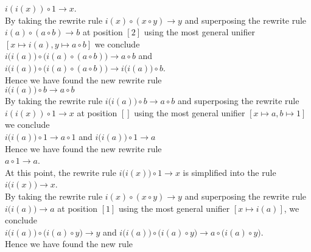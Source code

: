 $i(i(x)) \circ 1 \rightarrow x$.
\\[0.2cm]
By taking the rewrite rule $i(x) \circ (x \circ y) \rightarrow y$ and superposing the rewrite rule $i(a) \circ (a \circ b) \rightarrow b$
at position $[2]$ using the most general unifier $[x \mapsto i(a), y \mapsto a \circ b]$ we conclude
\\[0.2cm]
\hspace*{1.3cm}
$i\bigl(i(a)\bigr) \circ \bigl(i(a) \circ (a \circ b)\bigr) \rightarrow a \circ b $ \quad and \quad
$i\bigl(i(a)\bigr) \circ \bigl(i(a) \circ (a \circ b)\bigr) \rightarrow i\bigl(i(a)\bigr) \circ b$.
\\[0.2cm]
Hence we have found the new rewrite rule
\\[0.2cm]
\hspace*{1.3cm}
$i\bigl(i(a)\bigr) \circ b \rightarrow a \circ b$
\\[0.2cm]
By taking the rewrite rule $i\bigl(i(a)\bigr) \circ b \rightarrow a \circ b$ and superposing the rewrite rule $i(i(x)) \circ 1 \rightarrow x$ at position $[]$
using the most general unifier $[x \mapsto a, b \mapsto 1]$ we conclude  
\\[0.2cm]
\hspace*{1.3cm}
$i\bigl(i(a)\bigr) \circ 1 \rightarrow a \circ 1$ \quad and \quad
$i\bigl(i(a)\bigr) \circ 1 \rightarrow a$
\\[0.2cm]
Hence we have found the new rewrite rule
\\[0.2cm]
\hspace*{1.3cm}
$a \circ 1 \rightarrow a$.
\\[0.2cm]
At this point, the rewrite rule $i\bigl(i(x)\bigr) \circ 1 \rightarrow x$ is simplified into the rule
\\[0.2cm]
\hspace*{1.3cm}
$i\bigl(i(x)\bigr) \rightarrow x$.
\\[0.2cm]
By taking the rewrite rule $i(x) \circ (x \circ y) \rightarrow y$ and superposing the rewrite rule $i\bigl(i(a)\bigr) \rightarrow a$
at position $[1]$ using the most general unifier $[x \mapsto i(a)]$, we conclude
\\[0.2cm]
\hspace*{1.3cm}
$i\bigl(i(a)\bigr) \circ \bigl(i(a)\circ y\bigr) \rightarrow y$ \quad and \quad
$i\bigl(i(a)\bigr) \circ \bigl(i(a)\circ y\bigr) \rightarrow a \circ \bigl(i(a) \circ y\bigr)$.
\\[0.2cm]
Hence we have found the new rule
\\[0.2cm]
\hspace*{1.3cm}
